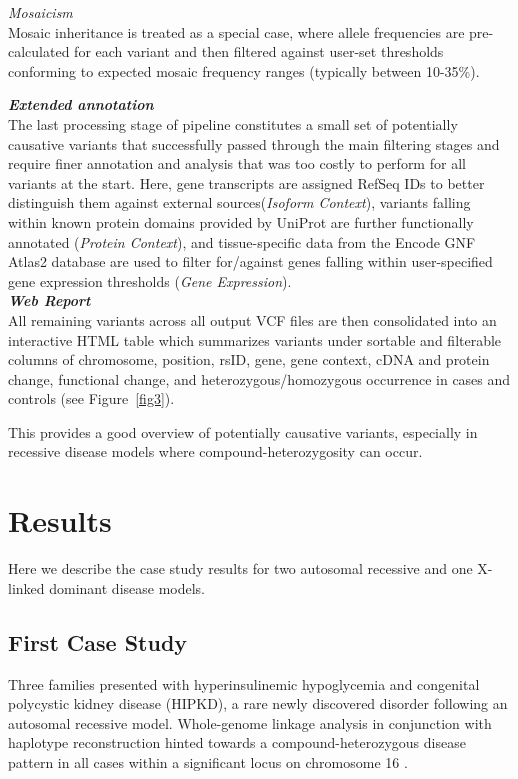 \documentclass[twocolumn]{bmcart}%
\newcommand{\triplesub}[2]{\noindent\textsl{#1}\\#2\\}  %
\begin{document}
{{	\triplesub{Mosaicism}{Mosaic inheritance is treated as a special case, where allele frequencies are pre-calculated for each variant and then filtered against user-set thresholds conforming to expected mosaic frequency ranges (typically between 10-35\%).}
}

\enlargethispage{0.6cm}

\triplesub{\bf Extended annotation}{The last processing stage of pipeline constitutes a small set of potentially causative variants that successfully passed through the main filtering stages and require finer annotation and analysis that was too costly to perform for all variants at the start. Here, gene transcripts are assigned RefSeq IDs to better distinguish them against external sources(\textit{Isoform Context}), variants falling within known protein domains provided by UniProt are further functionally annotated (\textit{Protein Context}), and tissue-specific data from the Encode GNF Atlas2 database are used to filter for/against genes falling within user-specified gene expression thresholds (\textit{Gene Expression}).}

\triplesub{\bf Web Report}{All remaining variants across all output VCF files are then consolidated into an interactive HTML table which summarizes variants under sortable and filterable columns of chromosome, position, rsID, gene, gene context, cDNA and protein change, functional change, and heterozygous/homozygous occurrence in cases and controls (see Figure~\ref{fig3}). 

This provides a good overview of potentially causative variants, especially in recessive disease models where compound-heterozygosity can occur.
}
}

\enlargethispage{0.6cm}

\section*{Results}

Here we describe the case study results for two autosomal recessive and one X-linked dominant disease models.

\subsection*{First Case Study}

Three families presented with hyperinsulinemic hypoglycemia and congenital polycystic kidney disease (HIPKD), a rare newly discovered disorder following an autosomal recessive model. Whole-genome linkage analysis in conjunction with haplotype reconstruction hinted towards a compound-heterozygous disease pattern in all cases within a significant locus on chromosome 16 \cite{cabezas2017polycystic}.
\end{document}
